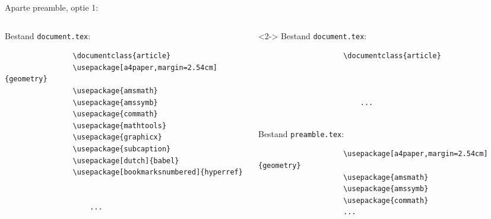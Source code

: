 \copyrightVincent
\begin{frame}[fragile]{Aparte preamble, optie 1: \texttt{}}
    \begin{columns}
        \begin{column}{0.5\textwidth}
            \small
            Bestand \texttt{document.tex}:
            \begin{verbatim}
                \documentclass{article}
                \usepackage[a4paper,margin=2.54cm]{geometry}
                \usepackage{amsmath}
                \usepackage{amssymb}
                \usepackage{commath}
                \usepackage{mathtools}
                \usepackage{graphicx}
                \usepackage{subcaption}
                \usepackage[dutch]{babel}
                \usepackage[bookmarksnumbered]{hyperref}

                
                    ...
                
            \end{verbatim}
        \end{column}
        \begin{column}{0.5\textwidth}
            \small
            \begin{uncoverenv}<2->%
                Bestand \texttt{document.tex}:
                \begin{verbatim}
                    \documentclass{article}
                    
            
                    
                        ...
                    
                \end{verbatim}

                \bigskip
                Bestand \texttt{preamble.tex}:
                \begin{verbatim}
                    \usepackage[a4paper,margin=2.54cm]{geometry}
                    \usepackage{amsmath}
                    \usepackage{amssymb}
                    \usepackage{commath}
                    ...
                \end{verbatim}
            \end{uncoverenv}
        \end{column}
    \end{columns}
\end{frame}
